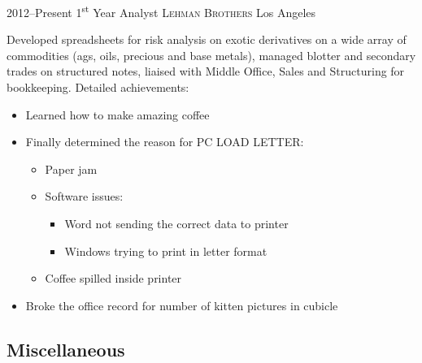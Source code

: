 \documentclass[11pt,a4paper,sans]{moderncv} %
\begin{document}
\cventry
    {2012--Present}
    {1\textsuperscript{st} Year Analyst}
    {\textsc{Lehman Brothers}}
    {Los Angeles}
    {}
    {Developed spreadsheets for risk analysis on exotic derivatives on a wide array of commodities (ags, oils, precious and base metals), managed blotter and secondary trades on structured notes, liaised with Middle Office, Sales and Structuring for bookkeeping.
\newline{}\newline{}
Detailed achievements:
\begin{itemize}
\item Learned how to make amazing coffee
\item Finally determined the reason for \textsc{PC LOAD LETTER}:
\begin{itemize}
\item Paper jam
\item Software issues:
\begin{itemize}
\item Word not sending the correct data to printer
\item Windows trying to print in letter format
\end{itemize}
\item Coffee spilled inside printer
\end{itemize}
\item Broke the office record for number of kitten pictures in cubicle
\end{itemize}}




\subsection{Miscellaneous}


\end{document}
